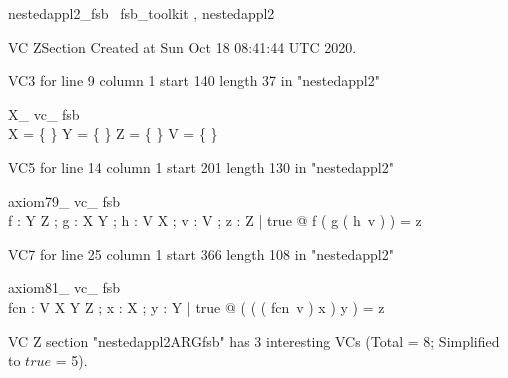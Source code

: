 \documentclass{article}
\begin{document}

\begin{zsection}	 \SECTION nestedappl2\_fsb \parents~fsb\_toolkit , nestedappl2
\end{zsection}

VC ZSection Created at Sun Oct 18 08:41:44 UTC 2020.

VC3 for line 9 column 1 start 140 length 37 in "nestedappl2"
\begin{theorem}{ X\_ vc\_ fsb}\\
 \lnot X = \{ \} \land \lnot Y = \{ \} \land \lnot Z = \{ \} \land \lnot V = \{ \} \\

\end{theorem}

VC5 for line 14 column 1 start 201 length 130 in "nestedappl2"
\begin{theorem}{ axiom79\_ vc\_ fsb}\\
 \exists f : Y \pfun Z ; g : X \pfun Y ; h : V \pfun X ; v : V ; z : Z | true @ f ( g ( h~v ) ) = z \\

\end{theorem}

VC7 for line 25 column 1 start 366 length 108 in "nestedappl2"
\begin{theorem}{ axiom81\_ vc\_ fsb}\\
 \exists fcn : V \pfun X \pfun Y \pfun Z ; x : X ; y : Y | true @ ( ( ( fcn~v ) x ) y ) = z \\

\end{theorem}



 VC Z section "nestedappl2ARGfsb" has $3$ interesting VCs (Total = 8; Simplified to $true$ = 5).



\end{document}
